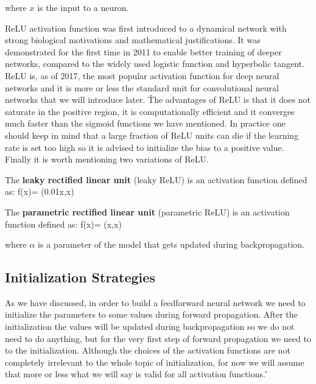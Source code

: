 where $x$ is the input to a neuron.
\ed


ReLU activation function was first introduced to a dynamical network with strong biological motivations and 
mathematical justifications. It was demonstrated for the first time in 2011 to enable better training of deeper 
networks, compared to the widely used logistic function and hyperbolic tangent. ReLU is, as of 2017, the most popular
activation function for deep neural networks and it is more or less the standard unit for convolutional neural 
networks that we will introduce later. \v

The advantages of ReLU is that it does not saturate in the positive region, it is computationally efficient and it 
converges much faster than the sigmoid functions we have mentioned. In practice one should keep in mind that a large 
fraction of ReLU units can die if the learning rate is set too high so it is advised to initialize the bias to a 
positive value. Finally it is worth mentioning two variations of ReLU\@.

The \textbf{leaky rectified linear unit }(leaky ReLU) is an activation function defined as:
\bse
f(x)= \max(0.01x,x)
\ese
\ed

The \textbf{parametric rectified linear unit }(parametric ReLU) is an activation function defined as:
\bse
f(x)= \max(\alpha x,x)
\ese

where $\alpha$ is a parameter of the model that gets updated during backpropagation.
\ed

\subsection{Initialization Strategies}

As we have discussed, in order to build a feedforward neural network we need to initialize the parameters to some 
values during forward propagation. After the initialization the values will be updated during backpropagation so we 
do not need to do anything, but for the very first step of forward propagation we need to to the initialization. 
Although the choices of the activation functions are not completely irrelevant to the whole topic of initialization, 
for now we will assume that more or less what we will say is valid for all activation functions. \v


